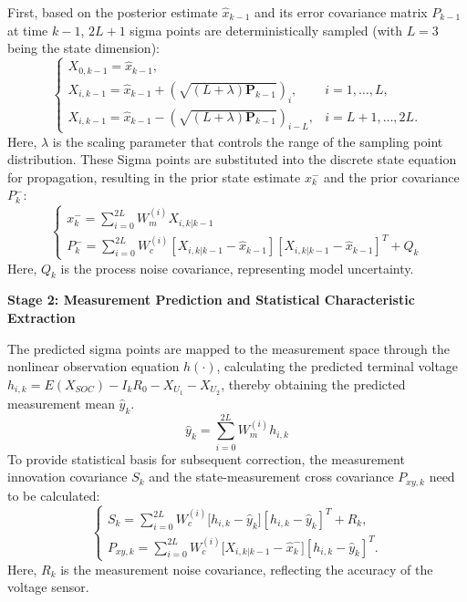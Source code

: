 \documentclass{mcmthesis}
\begin{document}
First, based on the posterior estimate $\widehat{{x}}_{k-1}$ and its error covariance matrix $P_{k-1}$ at time $k-1$, $2L+1$ sigma points are deterministically sampled (with $L=3$ being the state dimension):
\begin{equation}
\begin{cases}
{X}_{0,k-1} = \widehat{{x}}_{k-1}, \\
{X}_{i,k-1} = \widehat{{x}}_{k-1} + \left(\sqrt{(L+\lambda)\mathbf{P}_{k-1}}\right)_i, & i = 1, \ldots, L, \\
{X}_{i,k-1} = \widehat{{x}}_{k-1} - \left(\sqrt{(L+\lambda)\mathbf{P}_{k-1}}\right)_{i-L}, & i = L+1, \ldots, 2L.
\end{cases}
\end{equation}
Here, $\lambda$ is the scaling parameter that controls the range of the sampling point distribution. These Sigma points are substituted into the discrete state equation for propagation, resulting in the prior state estimate $x_k^-$ and the prior covariance $P_k^-$:
\begin{equation}
  \begin{cases}
x_k^- = \sum_{i=0}^{2L} W_m^{(i)} X_{i,k|k-1}\\ P_k^- = \sum_{i=0}^{2L} W_c^{(i)} [X_{i,k|k-1} - \hat{x}_{k-1}][X_{i,k|k-1} - \hat{x}_{k-1}]^T + Q_k
  \end{cases}
\end{equation}
Here, $Q_k$ is the process noise covariance, representing model uncertainty.

\textbf{Stage 2: Measurement Prediction and Statistical Characteristic Extraction}

The predicted sigma points are mapped to the measurement space through the nonlinear observation equation $h(\cdot)$, calculating the predicted terminal voltage $h_{i,k}=E(X_{SOC})-I_kR_0-X_{U_1}-X_{U_2}$, thereby obtaining the predicted measurement mean $\hat{y}_k$.
\begin{equation}
{\hat{y}}_k=\sum_{i=0}^{2L}{W_m^{(i)}h_{i,k}} 
\end{equation}
To provide statistical basis for subsequent correction, the measurement innovation covariance $S_k$ and the state-measurement cross covariance $P_{xy,k}$ need to be calculated:
\begin{equation}
\begin{cases}
  S_k=\sum_{i=0}^{2L}{W_c^{(i)}[h_{i,k}-}{\hat{y}}_k][h_{i,k}-\hat{y}_k]^T+R_k,\\
  P_{xy,k}=\sum_{i=0}^{2L}{W_c^{(i)}[X_{i,k|k-1}-{\hat{x}}_k^-}][h_{i,k}-\hat{y}_k]^T.
\end{cases}
\end{equation}
Here, $R_k$ is the measurement noise covariance, reflecting the accuracy of the voltage sensor.
\end{document}
